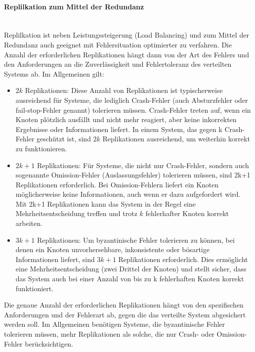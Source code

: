 \documentclass[../vs-script-first-v01.tex]{subfiles}
\begin{document}
\paragraph{Replilkation zum Mittel der Redundanz\\\\}
Replilkation ist neben Leistungssteigerung (Load Balancing) und zum Mittel der Redundanz auch geeignet mit Fehlersituation optimierter zu verfahren.
Die Anzahl der erforderlichen Replikationen hängt dann von der Art des Fehlers und den Anforderungen an die Zuverlässigkeit und Fehlertoleranz des verteilten Systems ab. Im Allgemeinen gilt: 
\begin{itemize}
\item \textbf{$2k$} Replikationen: Diese Anzahl von Replikationen ist typischerweise ausreichend für Systeme, die lediglich Crash-Fehler (auch Absturzfehler oder fail-stop-Fehler genannt) tolerieren müssen. Crash-Fehler treten auf, wenn ein Knoten plötzlich ausfällt und nicht mehr reagiert, aber keine inkorrekten Ergebnisse oder Informationen liefert. In einem System, das gegen k Crash-Fehler geschützt ist, sind $2k$ Replikationen ausreichend, um weiterhin korrekt zu funktionieren.
\item \textbf{$2k+1$} Replikationen: Für Systeme, die nicht nur Crash-Fehler, sondern auch sogenannte Omission-Fehler (Auslassungsfehler) tolerieren müssen, sind 2k+1 Replikationen erforderlich. Bei Omission-Fehlern liefert ein Knoten möglicherweise keine Informationen, auch wenn er dazu aufgefordert wird. Mit 2k+1 Replikationen kann das System in der Regel eine Mehrheitsentscheidung treffen und trotz $k$ fehlerhafter Knoten korrekt arbeiten.
\item \textbf{$3k+1$} Replikationen: Um byzantinische Fehler tolerieren zu können, bei denen ein Knoten unvorhersehbare, inkonsistente oder bösartige Informationen liefert, sind $3k+1$ Replikationen erforderlich. Dies ermöglicht eine Mehrheitsentscheidung (zwei Drittel der Knoten) und stellt sicher, dass das System auch bei einer Anzahl von bis zu k fehlerhaften Knoten korrekt funktioniert.
\end{itemize}
Die genaue Anzahl der erforderlichen Replikationen hängt von den spezifischen Anforderungen und der Fehlerart ab, gegen die das verteilte System abgesichert werden soll. Im Allgemeinen benötigen Systeme, die byzantinische Fehler tolerieren müssen, mehr Replikationen als solche, die nur Crash- oder Omission-Fehler berücksichtigen.
\end{document}
